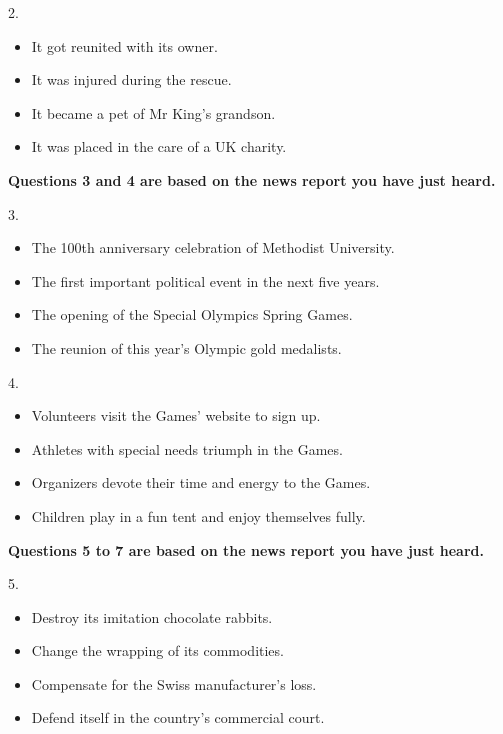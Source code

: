 \documentclass[UTF8,11pt]{ctexart}
\begin{document}
2.


\begin{itemize}[leftmargin=2em,itemsep=.2em,topsep=.4em]\item[A.] It got reunited with its owner.
\item[B.] It was injured during the rescue.
\item[C.] It became a pet of Mr King’s grandson.
\item[D.] It was placed in the care of a UK charity.
\end{itemize}

\textbf{Questions 3 and 4 are based on the news report you have just heard.}


3.


\begin{itemize}[leftmargin=2em,itemsep=.2em,topsep=.4em]\item[A.] The 100th anniversary celebration of Methodist University.
\item[B.] The first important political event in the next five years.
\item[C.] The opening of the Special Olympics Spring Games.
\item[D.] The reunion of this year’s Olympic gold medalists.
\end{itemize}

4.


\begin{itemize}[leftmargin=2em,itemsep=.2em,topsep=.4em]\item[A.] Volunteers visit the Games’ website to sign up.
\item[B.] Athletes with special needs triumph in the Games.
\item[C.] Organizers devote their time and energy to the Games.
\item[D.] Children play in a fun tent and enjoy themselves fully.
\end{itemize}

\textbf{Questions 5 to 7 are based on the news report you have just heard.}


5.


\begin{itemize}[leftmargin=2em,itemsep=.2em,topsep=.4em]\item[A.] Destroy its imitation chocolate rabbits.
\item[B.] Change the wrapping of its commodities.
\item[C.] Compensate for the Swiss manufacturer’s loss.
\item[D.] Defend itself in the country’s commercial court.
\end{itemize}
\end{document}
